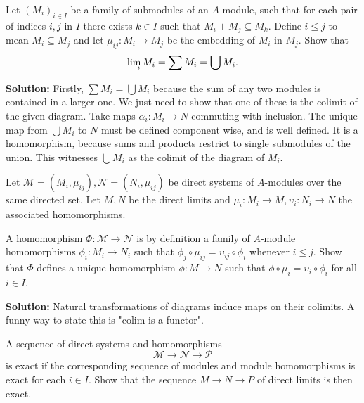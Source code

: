 \documentclass{article}
\begin{document}
\begin{exercise}
    Let \((M_i)_{i \in I}\) be a family of submodules of an \(A\)-module, such that for each pair of indices \(i, j\) in \(I\) there exists \(k \in I\) such that \(M_i + M_j \subseteq M_k\).
    Define \(i \leq j\) to mean \(M_i \subseteq M_j\) and let \(\mu_{ij} : M_i \to M_j\) be the embedding of \(M_i\) in \(M_j\).
    Show that
    \[
        \varinjlim M_i = \sum M_i = \bigcup M_i.
    \]
\end{exercise}

\noindent\textbf{Solution:}
Firstly, \(\sum M_i = \bigcup M_i\) because the sum of any two modules is contained in a larger one.
We just need to show that one of these is the colimit of the given diagram.
Take maps \(\alpha_i : M_i \to N\) commuting with inclusion.
The unique map from \(\bigcup M_i\) to \(N\) must be defined component wise, and is well defined.
It is a homomorphism, because sums and products restrict to single submodules of the union.
This witnesses \(\bigcup M_i\) as the colimit of the diagram of \(M_i\).

\begin{exercise}
    Let \(\mathcal{M} = (M_i, \mu_{ij}), \mathcal{N} = (N_i, \mu_{ij})\) be direct systems of \(A\)-modules over the same directed set.
    Let \(M, N\) be the direct limits and \(\mu_i : M_i \to M, \upsilon_i : N_i \to N\) the associated homomorphisms.
    
    A homomorphism \(\Phi : \mathcal{M} \to \mathcal{N}\) is by definition a family of \(A\)-module homomorphisms \(\phi_i : M_i \to N_i\) such that \(\phi_j \circ \mu_{ij} = \upsilon_{ij} \circ \phi_i\) whenever \(i \leq j\).
    Show that \(\Phi\) defines a unique homomorphism \(\phi : M \to N\) such that \(\phi \circ \mu_i = \upsilon_i \circ \phi_i\) for all \(i \in I\).
\end{exercise}

\noindent\textbf{Solution:}
Natural transformations of diagrams induce maps on their colimits.
A funny way to state this is "\(\mathrm{colim}\) is a functor".

\begin{exercise}
    A sequence of direct systems and homomorphisms
    \[
        \mathcal{M} \to \mathcal{N} \to \mathcal{P}
    \]
    is exact if the corresponding sequence of modules and module homomorphisms is exact for each \(i \in I\).
    Show that the sequence \(M \to N \to P\) of direct limits is then exact.
\end{exercise}
\end{document}
